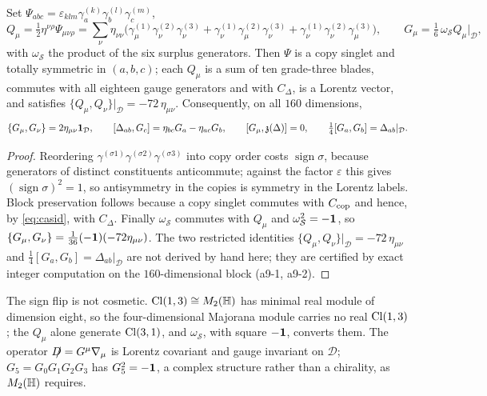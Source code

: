 \begin{theorem}
\label{thm:blockgamma}
Set $\Psi_{abc}=\varepsilon_{klm}\gamma^{(k)}_a\gamma^{(l)}_b\gamma^{(m)}_c$,
\[
Q_\mu=\tfrac12\eta^{\nu\rho}\Psi_{\mu\nu\rho}
=\sum_\nu\eta_{\nu\nu}\bigl(\gamma^{(1)}_\mu\gamma^{(2)}_\nu\gamma^{(3)}_\nu+\gamma^{(1)}_\nu\gamma^{(2)}_\mu\gamma^{(3)}_\nu+\gamma^{(1)}_\nu\gamma^{(2)}_\nu\gamma^{(3)}_\mu\bigr),
\qquad
G_\mu=\tfrac16\,\omega_{\mathcal S}Q_\mu\big|_{\mathcal D},
\]
with $\omega_{\mathcal S}$ the product of the six surplus generators. Then $\Psi$ is a copy singlet and totally symmetric in $(a,b,c)$; each $Q_\mu$
is a sum of ten grade-three blades, commutes with all eighteen gauge generators and with $C_\Delta$, is a Lorentz vector, and satisfies
$\{Q_\mu,Q_\nu\}|_{\mathcal D}=-72\,\eta_{\mu\nu}$. Consequently, on all $160$ dimensions,
\[
\{G_\mu,G_\nu\}=2\eta_{\mu\nu}\id_{\mathcal D},\qquad [\Delta_{ab},G_c]=\eta_{bc}G_a-\eta_{ac}G_b,\qquad [G_\mu,\mathfrak z(\Delta)]=0,\qquad
\tfrac14[G_a,G_b]=\Delta_{ab}|_{\mathcal D}.
\]
\end{theorem}

\begin{proof}
Reordering $\gamma^{(\sigma1)}\gamma^{(\sigma2)}\gamma^{(\sigma3)}$ into copy order costs $\operatorname{sign}\sigma$, because generators of distinct
constituents anticommute; against the factor $\varepsilon$ this gives $(\operatorname{sign}\sigma)^2=1$, so antisymmetry in the copies is symmetry
in the Lorentz labels. Block preservation follows because a copy singlet commutes with $C_{\rm cop}$ and hence, by \eqref{eq:casid}, with
$C_\Delta$. Finally $\omega_{\mathcal S}$ commutes with $Q_\mu$ and $\omega_{\mathcal S}^2=-\id$, so $\{G_\mu,G_\nu\}=\tfrac1{36}(-\id)(-72\eta_{\mu\nu})$.
The two restricted identities $\{Q_\mu,Q_\nu\}|_{\mathcal D}=-72\,\eta_{\mu\nu}$ and $\tfrac14[G_a,G_b]=\Delta_{ab}|_{\mathcal D}$ are not derived by hand here;
they are certified by exact integer computation on the $160$-dimensional block (a9-1, a9-2).
\end{proof}

The sign flip is not cosmetic. $\Cl(1,3)\cong M_2(\HH)$ has minimal real module of dimension eight, so the four-dimensional Majorana module
carries no real $\Cl(1,3)$; the $Q_\mu$ alone generate $\Cl(3,1)$, and $\omega_{\mathcal S}$, with square $-\id$, converts them. The operator
$\slashed D=G^\mu\nabla_\mu$ is Lorentz covariant and gauge invariant on $\mathcal D$; $G_5=G_0G_1G_2G_3$ has $G_5^2=-\id$, a complex structure
rather than a chirality, as $M_2(\HH)$ requires.

